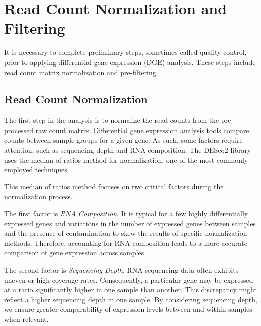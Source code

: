 \documentclass{article}
\begin{document}
\pagebreak

\section{Read Count Normalization and Filtering}
It is necessary to complete preliminary steps, sometimes called quality control, prior to applying differential gene expression (DGE) analysis. These steps include read count matrix normalization and pre-filtering.

\subsection{Read Count Normalization}
The first step in the analysis is to normalize the read counts from the pre-processed raw count matrix. Differential gene expression analysis tools compare counts between sample groups for a given gene. As such, some factors require attention, such as sequencing depth and RNA composition. The DESeq2 library uses the median of ratios method for normalization, one of the most commonly employed techniques.

This median of ratios method focuses on two critical factors during the normalization process.

The first factor is \emph{RNA Composition}. It is typical for a few highly differentially expressed genes and variations in the number of expressed genes between samples and the presence of contamination to skew the results of specific normalization methods. Therefore, accounting for RNA composition leads to a more accurate comparison of gene expression across samples.

The second factor is \emph{Sequencing Depth}. RNA sequencing data often exhibits uneven or high coverage rates. Consequently, a particular gene may be expressed at a ratio significantly higher in one sample than another. This discrepancy might reflect a higher sequencing depth in one sample. By considering sequencing depth, we ensure greater comparability of expression levels between and within samples when relevant.
\end{document}
